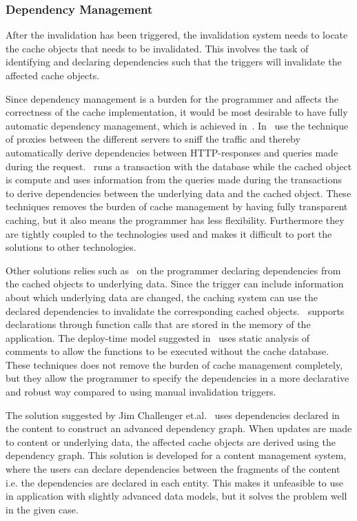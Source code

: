 
\subsubsection{Dependency Management}
\label{subsubsec:dependency-management}

After the invalidation has been triggered, the invalidation system needs to locate the cache objects that needs to be invalidated. This involves the task of identifying and declaring dependencies such that the triggers will invalidate the affected cache objects.

Since dependency management is a burden for the programmer and affects the correctness of the cache implementation, it would be most desirable to have fully automatic dependency management, which is achieved in~\cite{paper:liskov, paper:db-driven-http}. In~\cite{paper:db-driven-http} use the technique of proxies between the different servers to sniff the traffic and thereby automatically derive dependencies between HTTP-responses and queries made during the request.~\cite{paper:liskov} runs a transaction with the database while the cached object is compute and uses information from the queries made during the transactions to derive dependencies between the underlying data and the cached object. These techniques removes the burden of cache management by having fully transparent caching, but it also means the programmer has less flexibility. Furthermore they are tightly coupled to the technologies used and makes it difficult to port the solutions to other technologies.

Other solutions relies such as~\cite{paper:cache-genie, paper:deploy-time} on the programmer declaring dependencies from the cached objects to underlying data. Since the trigger can include information about which underlying data are changed, the caching system can use the declared dependencies to invalidate the corresponding cached objects.~\cite{paper:cache-genie} supports declarations through function calls that are stored in the memory of the application. The deploy-time model suggested in~\cite{paper:deploy-time} uses static analysis of comments to allow the functions to be executed without the cache database. These techniques does not remove the burden of cache management completely, but they allow the programmer to specify the dependencies in a more declarative and robust way compared to using manual invalidation triggers.

The solution suggested by Jim Challenger et.al.~\cite{paper:ibm, paper:ibm-extended} uses dependencies declared in the content to construct an advanced dependency graph. When updates are made to content or underlying data, the affected cache objects are derived using the dependency graph. This solution is developed for a content management system, where the users can declare dependencies between the fragments of the content i.e. the dependencies are declared in each entity. This makes it unfeasible to use in application with slightly advanced data models, but it solves the problem well in the given case.


